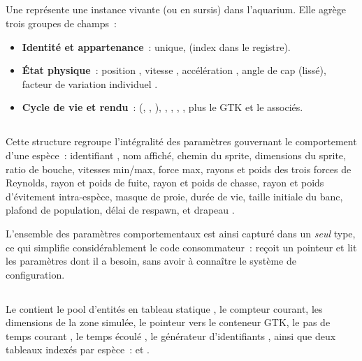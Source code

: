 \subsection{}

Une  représente une instance vivante (ou en
sursis) dans l'aquarium. Elle agrège trois groupes de champs~:

\begin{itemize}
  \item \textbf{Identité et appartenance}~:  unique,
     (index dans le registre).
  \item \textbf{État physique}~: position , vitesse
    , accélération , angle de cap
     (lissé), facteur de variation individuel
    .
  \item \textbf{Cycle de vie et rendu}~:  (,
    , ), ,
    , , ,
    plus le  GTK et le 
    associés.
\end{itemize}

\subsection{}

Cette structure regroupe l'intégralité des paramètres
gouvernant le comportement d'une espèce~: identifiant
, nom affiché, chemin du sprite, dimensions du sprite,
ratio de bouche, vitesses min/max, force max, rayons et poids
des trois forces de Reynolds, rayon et poids de fuite, rayon
et poids de chasse, rayon et poids d'évitement intra-espèce,
masque de proie, durée de vie, taille initiale du banc,
plafond de population, délai de respawn, et drapeau
.

L'ensemble des paramètres comportementaux est ainsi capturé
dans un \emph{seul} type, ce qui simplifie considérablement
le code consommateur~:  reçoit un pointeur
 et lit les paramètres dont il a
besoin, sans avoir à connaître le système de configuration.

\subsection{}

Le  contient le pool d'entités en tableau
statique , le compteur
courant, les dimensions de la zone simulée, le pointeur vers
le conteneur GTK, le pas de temps courant , le temps
écoulé , le générateur d'identifiants
, ainsi que deux tableaux indexés par espèce~:
 et
.


